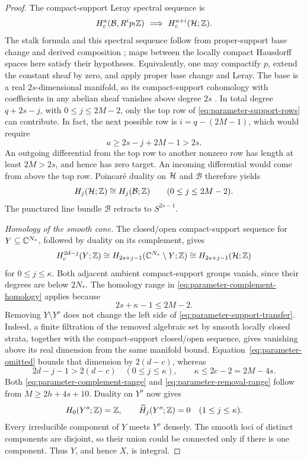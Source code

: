 \begin{proof}
The compact-support Leray spectral sequence is
\[
 H_c^a(\mathcal B,R^i p_!\mathbb Z)
       \ \Longrightarrow\ H_c^{a+i}(\mathcal H;\mathbb Z).
\]
The stalk formula and this spectral sequence follow from proper-support
base change and derived composition
\cite[Theorems~5.9 and~5.10]{SchnurerSoergel16}; maps between the locally
compact Hausdorff spaces here satisfy their hypotheses. Equivalently,
one may compactify \(p\), extend the constant sheaf by zero, and apply
proper base change and Leray. The base is a real \(2s\)-dimensional
manifold, so its compact-support cohomology with coefficients in any
abelian sheaf vanishes above degree \(2s\)
\cite[Proposition~5.1.2(ii)]{Schapira}. In total degree \(q+2s-j\), with
\(0\le j\le2M-2\), only the top row of
\eqref{eq:parameter-support-rows} can contribute.  In fact, the next
possible row is \(i=q-(2M-1)\), which would require
\[
 a\ge2s-j+2M-1>2s.
\]
An outgoing differential from the top row to another nonzero row
has length at least \(2M>2s\), and hence has zero target.  An
incoming differential would come from above the top row.
Poincar\'e duality on \(\mathcal H\) and \(\mathcal B\) therefore yields
\begin{equation}
 H_j(\mathcal H;\mathbb Z)\cong H_j(\mathcal B;\mathbb Z)
       \qquad(0\le j\le2M-2).
 \label{eq:parameter-complement-homology}
\end{equation}
The punctured line bundle \(\mathcal B\) retracts to
\(S^{2s-1}\).

\emph{Homology of the smooth cone.}
The closed/open compact-support sequence for
\(Y\subseteq\mathbb C^{N_*}\), followed by duality on its complement,
gives
\begin{equation}
 H_c^{2d-j}(Y;\mathbb Z)
   \cong H_{2s+j-1}(\mathbb C^{N_*}\setminus Y;\mathbb Z)
   \cong H_{2s+j-1}(\mathcal H;\mathbb Z)
 \label{eq:parameter-support-transfer}
\end{equation}
for \(0\le j\le\kappa\).  Both adjacent ambient compact-support
groups vanish, since their degrees are below \(2N_*\).
The homology range in \eqref{eq:parameter-complement-homology}
applies because
\begin{equation}
 2s+\kappa-1\le2M-2.
 \label{eq:parameter-complement-range}
\end{equation}
Removing \(Y\setminus Y^o\) does not change the left side of
\eqref{eq:parameter-support-transfer}. Indeed, a finite filtration of
the removed algebraic set by smooth locally closed strata, together with
the compact-support closed/open sequence, gives vanishing above its real
dimension from the same manifold bound.
Equation~\eqref{eq:parameter-omitted} bounds that dimension by
\(2(d-c)\), whereas
\begin{equation}
 2d-j-1>2(d-c)\quad(0\le j\le\kappa),
 \qquad
 \kappa\le2c-2=2M-4s.
 \label{eq:parameter-removal-range}
\end{equation}
Both \eqref{eq:parameter-complement-range} and
\eqref{eq:parameter-removal-range} follow from
\(M\ge2h+4s+10\).
Duality on \(Y^o\) now gives
\[
 H_0(Y^o;\mathbb Z)=\mathbb Z,\qquad
 \widetilde H_j(Y^o;\mathbb Z)=0\quad(1\le j\le\kappa).
\]
Every irreducible component of \(Y\) meets \(Y^o\) densely.
The smooth loci of distinct components are disjoint, so their
union could be connected only if there is one component.
Thus \(Y\), and hence \(X\), is integral.


\end{proof}
